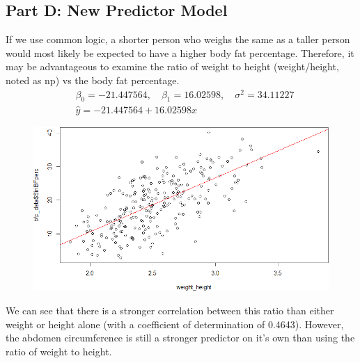 \documentclass[a4paper, 11pt]{article}
\begin{document}
\subsection*{Part D: New Predictor Model}
If we use common logic, a shorter person who weighs the same as a taller person would most likely be expected to have a higher body fat percentage. Therefore, it may be advantageous to examine the ratio of weight to height (weight/height, noted as np) vs the body fat percentage.
\begin{align*}
	&\beta_0 = -21.447564 ,\quad \beta_1 = 16.02598 ,\quad \sigma^2 =  34.11227 \\
	&\hat{y} = -21.447564 + 16.02598 x
\end{align*}
\begin{figure}[H]
	\centering
	\includegraphics[scale=0.65]{np_plot.png}
\end{figure}
We can see that there is a stronger correlation between this ratio than either weight or height alone (with a coefficient of determination of 0.4643). However, the abdomen circumference is still a stronger predictor on it's own than using the ratio of weight to height.
\end{document}
